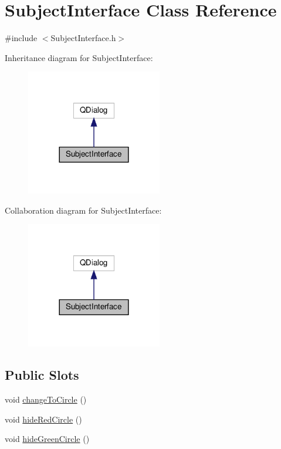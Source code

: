 \hypertarget{class_subject_interface}{}\section{Subject\+Interface Class Reference}
\label{class_subject_interface}


{\ttfamily \#include $<$Subject\+Interface.\+h$>$}



Inheritance diagram for Subject\+Interface\+:
\nopagebreak
\begin{figure}[H]
\begin{center}
\leavevmode
\includegraphics[width=168pt]{class_subject_interface__inherit__graph}
\end{center}
\end{figure}


Collaboration diagram for Subject\+Interface\+:
\nopagebreak
\begin{figure}[H]
\begin{center}
\leavevmode
\includegraphics[width=168pt]{class_subject_interface__coll__graph}
\end{center}
\end{figure}
\subsection*{Public Slots}
\begin{DoxyCompactItemize}
\item 
void \hyperlink{class_subject_interface_a18da5ec27033f0af048203cecffb45e0}{change\+To\+Circle} ()
\item 
void \hyperlink{class_subject_interface_a4180ce5ba88bd958c3be49ab1f7a69cf}{hide\+Red\+Circle} ()
\item 
void \hyperlink{class_subject_interface_a94f913d3a6bd8719617bcdd7950d7dba}{hide\+Green\+Circle} ()
\end{DoxyCompactItemize}
